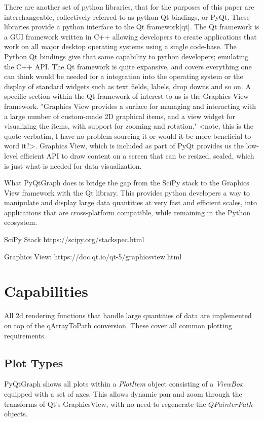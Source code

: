 \documentclass[journal]{vgtc}                %
\begin{document}
There are another set of python libraries, that for the purposes of this paper are interchangeable, collectively referred to as python Qt-bindings, or PyQt.  These libraries provide a python interface to the Qt framework[qt].  The Qt framework is a GUI framework written in C++ allowing developers to create applications that work on all major desktop operating systems using a single code-base.  The Python Qt bindings give that same capability to python developers; emulating the C++ API.  The Qt framework is quite expansive, and covers everything one can think would be needed for a integration into the operating system or the display of standard widgets such as text fields, labels, drop downs and so on.  A specific section within the Qt framework of interest to us is the Graphics View framework.  "Graphics View provides a surface for managing and interacting with a large number of custom-made 2D graphical items, and a view widget for visualizing the items, with support for zooming and rotation."  <note, this is the quote verbatim, I have no problem sourcing it or would it be more beneficial to word it?>. Graphics View, which is included as part of PyQt provides us the low-level efficient API to draw content on a screen that can be resized, scaled, which is just what is needed for data visualization.  

What PyQtGraph does is bridge the gap from the SciPy stack to the Graphics View framework with the Qt library.  This provides python developers a way to manipulate and display large data quantities at very fast and efficient scales, into applications that are cross-platform compatible, while remaining in the Python ecosystem.


SciPy Stack
https://scipy.org/stackspec.html

Graphics View:
https://doc.qt.io/qt-5/graphicsview.html

\section{Capabilities}

All 2d rendering functions that handle large quantities of data are implemented on top of the qArrayToPath conversion. These cover all common plotting requirements.

\subsection{Plot Types}

PyQtGraph shows all plots within a \emph{PlotItem} object consisting of a \emph{ViewBox} equipped with a set of axes. This allows dynamic pan and zoom through the transforms of Qt's GraphicsView, with no need to regenerate the $QPainterPath$ objects.
\end{document}
